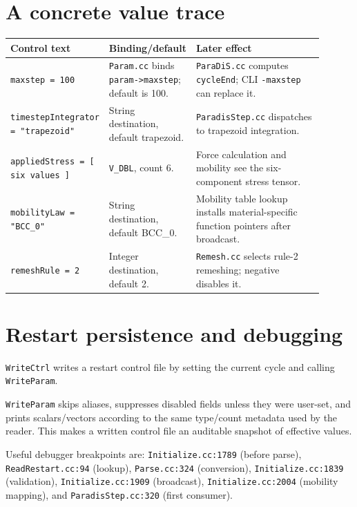 \documentclass[11pt]{article}
\newcommand{\code}[1]{\texorpdfstring{\nolinkurl{#1}}{#1}}
\begin{document}
\section{A concrete value trace}
\begin{longtable}{p{0.23\linewidth}p{0.24\linewidth}p{0.43\linewidth}}
\toprule
\textbf{Control text} & \textbf{Binding/default} & \textbf{Later effect}\\
\midrule
\code{maxstep = 100} & \code{Param.cc} binds \code{param->maxstep}; default is 100. & \code{ParaDiS.cc} computes \code{cycleEnd}; CLI \code{-maxstep} can replace it.\\
\code{timestepIntegrator = "trapezoid"} & String destination, default trapezoid. & \code{ParadisStep.cc} dispatches to trapezoid integration.\\
\code{appliedStress = [ six values ]} & \code{V_DBL}, count 6. & Force calculation and mobility see the six-component stress tensor.\\
\code{mobilityLaw = "BCC_0"} & String destination, default BCC\_0. & Mobility table lookup installs material-specific function pointers after broadcast.\\
\code{remeshRule = 2} & Integer destination, default 2. & \code{Remesh.cc} selects rule-2 remeshing; negative disables it.\\
\bottomrule
\end{longtable}

\section{Restart persistence and debugging}

\code{WriteCtrl} writes a restart control file by setting the current cycle and calling \code{WriteParam}.\

\code{WriteParam} skips aliases, suppresses disabled fields unless they were user-set, and prints scalars/vectors according to the same type/count metadata used by the reader. This makes a written control file an auditable snapshot of effective values.

Useful debugger breakpoints are: \code{Initialize.cc:1789} (before parse), \code{ReadRestart.cc:94} (lookup), \code{Parse.cc:324} (conversion), \code{Initialize.cc:1839} (validation), \code{Initialize.cc:1909} (broadcast), \code{Initialize.cc:2004} (mobility mapping), and \code{ParadisStep.cc:320} (first consumer).
\end{document}
